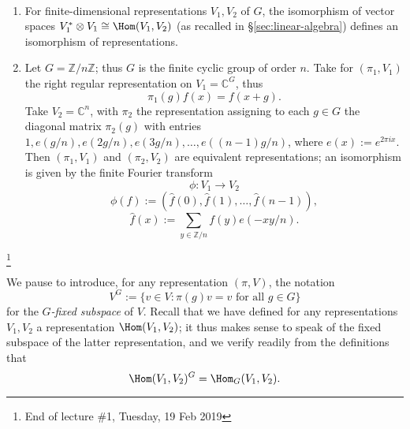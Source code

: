 \documentclass[reqno]{amsart} 
\begin{document}
\begin{example}
~
  \begin{enumerate}
  \item For finite-dimensional representations $V_1, V_2$ of $G$, the isomorphism of vector spaces $V_1^* \otimes V_1 \cong \Hom(V_1,V_2)$ (as recalled in \S\ref{sec:linear-algebra}) defines an isomorphism of representations.
  \item Let $G = \mathbb{Z}/n \mathbb{Z}$; thus $G$ is the finite cyclic group of order $n$.  Take for $(\pi_1,V_1)$ the right regular representation on $V_1 = \mathbb{C}^G$, thus
    \begin{equation*}
      \pi_1(g) f(x) = f(x + g).
    \end{equation*}
    Take $V_2 = \mathbb{C}^n$, with $\pi_2$ the representation assigning to each $g \in G$ the diagonal matrix $\pi_2(g)$ with entries $1, e(g/n), e(2 g/n), e(3 g/n), \dotsc, e((n-1) g/n)$, where $e(x) := e^{2 \pi i x}$.  Then $(\pi_1,V_1)$ and $(\pi_2,V_2)$ are equivalent representations; an isomorphism is given by the finite Fourier transform
    \begin{equation*}
      \phi : V_1 \rightarrow V_2
    \end{equation*}
    \begin{equation*}
      \phi(f) := (\hat{f}(0), \hat{f}(1), \dotsc, \hat{f}(n-1)),
    \end{equation*}
    \begin{equation*}
      \hat{f}(x) := \sum_{y \in \mathbb{Z}/n} f(y) e(-x y/n).
    \end{equation*}
  \end{enumerate}
\end{example}
\footnote{End of lecture \#1, Tuesday, 19 Feb 2019}

We pause to introduce, for any representation $(\pi,V)$, the notation
\begin{equation*}
  V^G :=  \{v \in V : \pi(g) v = v \text{ for all } g \in G\}
\end{equation*}
for the \emph{$G$-fixed subspace} of $V$.  Recall that we have defined for any representations $V_1, V_2$ a representation $\Hom(V_1,V_2)$; it thus makes sense to speak of the fixed subspace of the latter representation, and we verify readily from the definitions that
\begin{equation*}
  \Hom(V_1,V_2)^G = \Hom_G(V_1, V_2).
\end{equation*}
\end{document}
